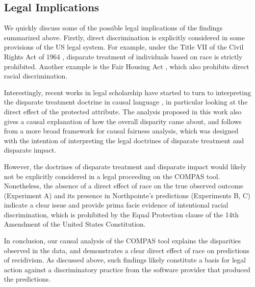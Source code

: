 \documentclass{article}
\begin{document}
\hypertarget{legal-implications}{%
\subsection{Legal Implications}\label{legal-implications}}

We quickly discuss some of the possible legal implications of the
findings summarized above. Firstly, direct discrimination is explicitly
considered in some provisions of the US legal system. For example, under
the Title VII of the Civil Rights Act of 1964 \cite{act1964civil},
disparate treatment of individuals based on race is strictly prohibited.
Another example is the Fair Housing Act \cite{housing1968fair}, which
also prohibits direct racial discrimination.

Interestingly, recent works in legal scholarship have started to turn to
interpreting the disparate treatment doctrine in causal language
\cite{plecko2022causal}, in particular looking at the direct effect of
the protected attribute. The analysis proposed in this work also gives a
causal explanation of how the overall disparity came about, and follows
from a more broad framework for causal fairness analysis, which was
designed with the intention of interpreting the legal doctrines of
disparate treatment and disparate impact.

However, the doctrines of disparate treatment and disparate impact would
likely not be explicitly considered in a legal proceeding on the COMPAS
tool. Nonetheless, the absence of a direct effect of race on the true
observed outcome (Experiment A) and its presence in Northpointe's
predictions (Experiments B, C) indicate a clear issue and provide prima
facie evidence of intentional racial discrimination, which is prohibited
by the Equal Protection clause of the 14th Amendment of the United
States Constitution.

In conclusion, our causal analysis of the COMPAS tool explains the
disparities observed in the data, and demonstrates a clear direct effect
of race on predictions of recidivism. As discussed above, such findings
likely constitute a basis for legal action against a discriminatory
practice from the software provider that produced the predictions.



\end{document}
